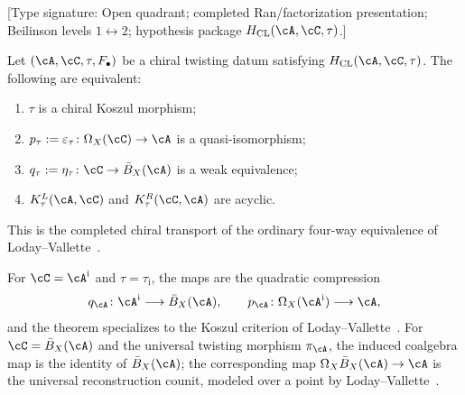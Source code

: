 \begin{theorem}
\label{thm:fundamental-twisting-morphisms}
\textup{[Type signature: Open quadrant; completed Ran/factorization
presentation; Beilinson levels \(1\leftrightarrow2\); hypothesis
package \(H_{\mathrm{CL}}(\cA,\cC,\tau)\).]}

Let \((\cA,\cC,\tau,F_\bullet)\) be a chiral twisting datum satisfying
\(H_{\mathrm{CL}}(\cA,\cC,\tau)\).  The following are equivalent:
\begin{enumerate}[label=\textup{(\roman*)}]
\item\label{ftm:koszul}
 \(\tau\) is a chiral Koszul morphism;
\item\label{ftm:counit}
 \(p_\tau:=\varepsilon_\tau\colon\Omega_X(\cC)\to\cA\) is a
 quasi-isomorphism;
\item\label{ftm:unit}
 \(q_\tau:=\eta_\tau\colon\cC\to\bar B_X(\cA)\) is a weak
 equivalence;
\item\label{ftm:acyclic}
 \(K_\tau^L(\cA,\cC)\) and \(K_\tau^R(\cC,\cA)\) are acyclic.
\end{enumerate}
This is the completed chiral transport of the ordinary four-way
equivalence of Loday--Vallette~\cite[Theorem~2.3.2]{LV12}.

For \(\cC=\cA^{\mathrm i}\) and \(\tau=\tau_{\mathrm i}\), the maps are
the quadratic compression
\[
 q_\cA\colon\cA^{\mathrm i}\longrightarrow\bar B_X(\cA),
 \qquad
 p_\cA\colon\Omega_X(\cA^{\mathrm i})\longrightarrow\cA,
\]
and the theorem specializes to the Koszul criterion of
Loday--Vallette~\cite[Theorem~3.4.6]{LV12}.  For
\(\cC=\bar B_X(\cA)\) and the universal twisting morphism
\(\pi_\cA\), the induced coalgebra map is the identity of
\(\bar B_X(\cA)\); the corresponding map
\(\Omega_X\bar B_X(\cA)\to\cA\) is the universal reconstruction
counit, modeled over a point by
Loday--Vallette~\cite[Corollary~2.3.4]{LV12}.
\end{theorem}

